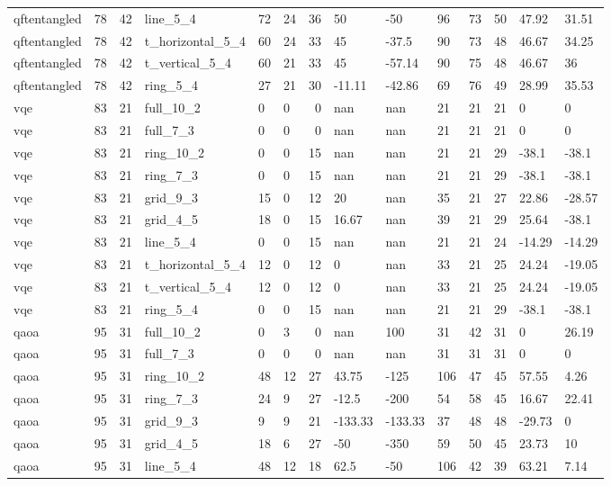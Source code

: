 \begin{longtable}{lrrlllrllllrll}
qftentangled & 78 & 42 & line\_5\_4 & 72 & 24 & 36 & 50 & -50 & 96 & 73 & 50 & 47.92 & 31.51 \\
qftentangled & 78 & 42 & t\_horizontal\_5\_4 & 60 & 24 & 33 & 45 & -37.5 & 90 & 73 & 48 & 46.67 & 34.25 \\
qftentangled & 78 & 42 & t\_vertical\_5\_4 & 60 & 21 & 33 & 45 & -57.14 & 90 & 75 & 48 & 46.67 & 36 \\
qftentangled & 78 & 42 & ring\_5\_4 & 27 & 21 & 30 & -11.11 & -42.86 & 69 & 76 & 49 & 28.99 & 35.53 \\
vqe & 83 & 21 & full\_10\_2 & 0 & 0 & 0 & nan & nan & 21 & 21 & 21 & 0 & 0 \\
vqe & 83 & 21 & full\_7\_3 & 0 & 0 & 0 & nan & nan & 21 & 21 & 21 & 0 & 0 \\
vqe & 83 & 21 & ring\_10\_2 & 0 & 0 & 15 & nan & nan & 21 & 21 & 29 & -38.1 & -38.1 \\
vqe & 83 & 21 & ring\_7\_3 & 0 & 0 & 15 & nan & nan & 21 & 21 & 29 & -38.1 & -38.1 \\
vqe & 83 & 21 & grid\_9\_3 & 15 & 0 & 12 & 20 & nan & 35 & 21 & 27 & 22.86 & -28.57 \\
vqe & 83 & 21 & grid\_4\_5 & 18 & 0 & 15 & 16.67 & nan & 39 & 21 & 29 & 25.64 & -38.1 \\
vqe & 83 & 21 & line\_5\_4 & 0 & 0 & 15 & nan & nan & 21 & 21 & 24 & -14.29 & -14.29 \\
vqe & 83 & 21 & t\_horizontal\_5\_4 & 12 & 0 & 12 & 0 & nan & 33 & 21 & 25 & 24.24 & -19.05 \\
vqe & 83 & 21 & t\_vertical\_5\_4 & 12 & 0 & 12 & 0 & nan & 33 & 21 & 25 & 24.24 & -19.05 \\
vqe & 83 & 21 & ring\_5\_4 & 0 & 0 & 15 & nan & nan & 21 & 21 & 29 & -38.1 & -38.1 \\
qaoa & 95 & 31 & full\_10\_2 & 0 & 3 & 0 & nan & 100 & 31 & 42 & 31 & 0 & 26.19 \\
qaoa & 95 & 31 & full\_7\_3 & 0 & 0 & 0 & nan & nan & 31 & 31 & 31 & 0 & 0 \\
qaoa & 95 & 31 & ring\_10\_2 & 48 & 12 & 27 & 43.75 & -125 & 106 & 47 & 45 & 57.55 & 4.26 \\
qaoa & 95 & 31 & ring\_7\_3 & 24 & 9 & 27 & -12.5 & -200 & 54 & 58 & 45 & 16.67 & 22.41 \\
qaoa & 95 & 31 & grid\_9\_3 & 9 & 9 & 21 & -133.33 & -133.33 & 37 & 48 & 48 & -29.73 & 0 \\
qaoa & 95 & 31 & grid\_4\_5 & 18 & 6 & 27 & -50 & -350 & 59 & 50 & 45 & 23.73 & 10 \\
qaoa & 95 & 31 & line\_5\_4 & 48 & 12 & 18 & 62.5 & -50 & 106 & 42 & 39 & 63.21 & 7.14 \\

\end{longtable}
